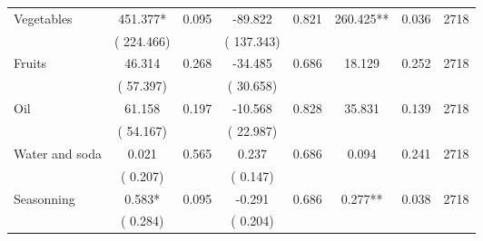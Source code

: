 \begin{tabular}{l*{7}{c}}
 Vegetables       &            451.377*       &        0.095  &            -89.822       &        0.821  &            260.425**       &              0.036 &  2718 \\ 
                       &       (     224.466)             &                               &       (     137.343)                     &                               &                                               &                                &                      \\ 

 Fruits       &             46.314       &        0.268  &            -34.485       &        0.686  &             18.129       &              0.252 &  2718 \\ 
                       &       (      57.397)             &                               &       (      30.658)                     &                               &                                               &                                &                      \\ 

 Oil       &             61.158       &        0.197  &            -10.568       &        0.828  &             35.831       &              0.139 &  2718 \\ 
                       &       (      54.167)             &                               &       (      22.987)                     &                               &                                               &                                &                      \\ 

 Water and soda       &              0.021       &        0.565  &              0.237       &        0.686  &              0.094       &              0.241 &  2718 \\ 
                       &       (       0.207)             &                               &       (       0.147)                     &                               &                                               &                                &                      \\ 

 Seasonning       &              0.583*       &        0.095  &             -0.291       &        0.686  &              0.277**       &              0.038 &  2718 \\ 
                       &       (       0.284)             &                               &       (       0.204)                     &                               &                                               &                                &                      \\ 


\end{tabular}

